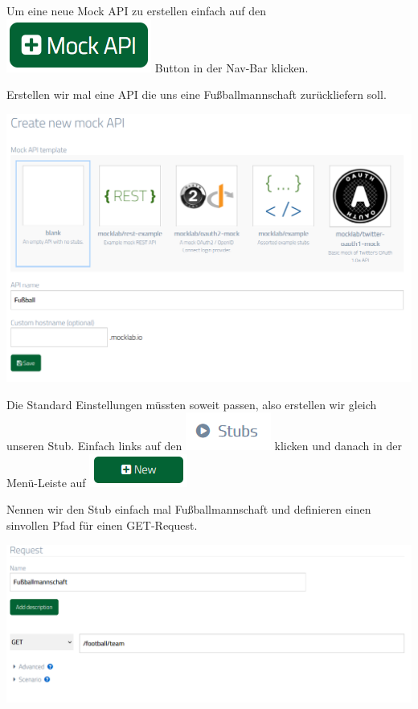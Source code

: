 Um eine neue Mock API zu erstellen einfach auf den \includegraphics[scale=0.5]{pics/mocklab-tutorial/new-mock-api-button.png} Button in der Nav-Bar klicken.

\newpage
Erstellen wir mal eine API die uns eine Fußballmannschaft zurückliefern soll.
\bigskip

\includegraphics[scale=0.5]{pics/mocklab-tutorial/create-mock-api.PNG}

Die Standard Einstellungen müssten soweit passen, also erstellen wir gleich unseren Stub.
Einfach links auf den \includegraphics[scale=0.5]{pics/mocklab-tutorial/new-stub-button.PNG}
klicken und danach in der Menü-Leiste auf \includegraphics[scale=0.5]{pics/mocklab-tutorial/new-button.PNG}

Nennen wir den Stub einfach mal Fußballmannschaft und definieren einen sinvollen Pfad für einen GET-Request.
\bigskip

\includegraphics[scale=0.5]{pics/mocklab-tutorial/request.PNG}


